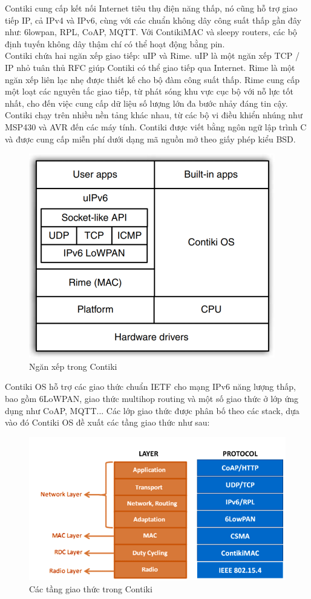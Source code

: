 \documentclass{report}
\begin{document}
Contiki cung cấp kết nối Internet tiêu thụ điện năng thấp, nó cũng hỗ trợ giao tiếp
IP, cả IPv4 và IPv6, cùng với các chuẩn không dây công suất thấp gần đây như:
6lowpan, RPL, CoAP, MQTT. Với ContikiMAC và sleepy routers, các bộ định
tuyến không dây thậm chí có thể hoạt động bằng pin. \\

Contiki chứa hai ngăn xếp giao tiếp: uIP và Rime. uIP là một ngăn xếp TCP / IP nhỏ tuân thủ RFC giúp Contiki có thể giao tiếp qua Internet. Rime là một ngăn xếp liên lạc nhẹ được thiết kế cho bộ đàm công suất thấp. Rime cung cấp một loạt các nguyên tắc giao tiếp, từ phát sóng khu vực cục bộ với nỗ lực tốt nhất, cho đến việc cung cấp dữ liệu số lượng lớn đa bước nhảy đáng tin cậy. \\

Contiki chạy trên nhiều nền tảng khác nhau, từ các bộ vi điều khiển nhúng như MSP430 và AVR đến các máy tính. Contiki được viết bằng ngôn ngữ lập trình C và được cung cấp miễn phí dưới dạng mã nguồn mở theo giấy phép kiểu BSD.
\begin{figure}[h]
	\centering
	\includegraphics[scale = 0.4]{fig13.png}
	\caption{Ngăn xếp trong Contiki}
	\label{fig:Graph13}
\end{figure}
Contiki OS hỗ trợ các giao thức chuẩn IETF cho mạng IPv6 năng lượng thấp, bao gồm 6LoWPAN, giao thức multihop routing và một số giao thức ở lớp ứng dụng như CoAP, MQTT...
Các lớp giao thức được phân bố theo các stack, dựa vào đó Contiki OS đề xuất các tầng giao thức
như sau:
\begin{figure}[h]
	\centering
	\includegraphics[scale = 0.6]{fig14.png}
	\caption{Các tầng giao thức trong Contiki}
	\label{fig:Graph14}
\end{figure}
\end{document}
